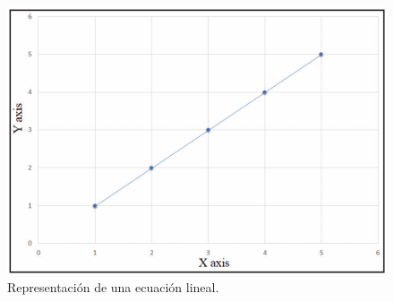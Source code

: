 \documentclass[12pt]{article}
\begin{document}
        \begin{figure}[h]
                \centering
                \includegraphics[width=0.7\linewidth]{imagenes/Imagen1}
                \caption{Representación de una ecuación lineal.}
                \label{fig:Imagen1}
        \end{figure}
        
\end{document}
